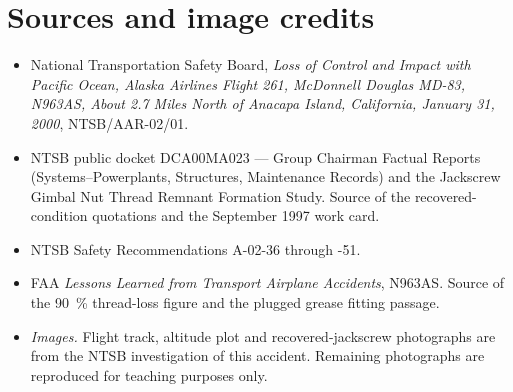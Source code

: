 \documentclass[11pt,a4paper]{article}
\begin{document}
\section*{Sources and image credits}

\begin{itemize}[leftmargin=*,itemsep=1pt,font=\footnotesize]
\item[] {\footnotesize National Transportation Safety Board, \emph{Loss of Control and Impact with
  Pacific Ocean, Alaska Airlines Flight 261, McDonnell Douglas MD-83, N963AS, About 2.7 Miles North
  of Anacapa Island, California, January 31, 2000}, NTSB/AAR-02/01.}
\item[] {\footnotesize NTSB public docket DCA00MA023 --- Group Chairman Factual Reports
  (Systems--Powerplants, Structures, Maintenance Records) and the Jackscrew Gimbal Nut Thread
  Remnant Formation Study. Source of the recovered-condition quotations and the September 1997 work
  card.}
\item[] {\footnotesize NTSB Safety Recommendations A-02-36 through -51.}
\item[] {\footnotesize FAA \emph{Lessons Learned from Transport Airplane Accidents}, N963AS. Source
  of the \SI{90}{\percent} thread-loss figure and the plugged grease fitting passage.}
\item[] {\footnotesize \emph{Images.} Flight track, altitude plot and recovered-jackscrew
  photographs are from the NTSB investigation of this accident. Remaining photographs are
  reproduced for teaching purposes only.}
\end{itemize}

\vspace{4pt}
\end{document}
